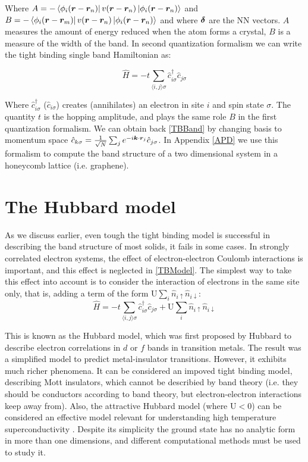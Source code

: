 Where $A = -\bra{\phi_i(\boldsymbol{r}-\boldsymbol{r}_n)}v(\boldsymbol{r}-\boldsymbol{r}_n) \ket{\phi_i(\boldsymbol{r}-\boldsymbol{r}_n)}$ and $B = -\bra{\phi_i(\boldsymbol{r}-\boldsymbol{r}_m)}v(\boldsymbol{r}-\boldsymbol{r}_n) \ket{\phi_i(\boldsymbol{r}-\boldsymbol{r}_n)}$ and where $\boldsymbol{\delta}$ are the NN vectors. $A$ measures the amount of energy reduced when the atom forms a crystal, $B$ is a measure of the width of the band. 
In second quantization formalism we can write the tight binding single band Hamiltonian as:

\begin{equation}
\label{TBModel}
\hat{H} = -t\sum_{\langle i,j \rangle \sigma} \hat{c}^{\dagger}_{i\sigma}\hat{c}_{j\sigma}
\end{equation}

Where $\hat{c}^{\dagger}_{i\sigma}$ ($\hat{c}_{i\sigma}$) creates (annihilates) an electron in site $i$ and spin state $\sigma$. The quantity $t$ is the hopping amplitude, and plays the same role $B$ in the first quantization formalism. We can obtain back \ref{TBBand} by changing basis to momentum space $\hat{c}_{k\sigma} = \frac{1}{\sqrt{N}}\sum_j e^{-i\boldsymbol{k}\cdot\boldsymbol{r}_j}\hat{c}_{j\sigma}$. In Appendix \ref{APD} we use this formalism to compute the band structure of a two dimensional system in a honeycomb lattice (i.e. graphene).



\section{The Hubbard model}

As we discuss earlier, even tough the tight binding model is successful in describing the band structure of most solids, it fails in some cases. In strongly correlated electron systems, the effect of electron-electron Coulomb interactions is important, and this effect is neglected in \ref{TBModel}. The simplest way to take this effect into account is to consider the interaction of electrons in the same site only, that is, adding a term of the form $\text{U}\sum_i \hat{n}_{i\uparrow}\hat{n}_{i\downarrow}$:
\begin{equation}
\label{HH}
\hat{H} = -t\sum_{\langle i,j \rangle \sigma} \hat{c}^{\dagger}_{i\sigma}\hat{c}_{j\sigma} + \text{U}\sum_i \hat{n}_{i\uparrow}\hat{n}_{i\downarrow}
\end{equation}

This is known as the Hubbard model, which was first proposed by Hubbard \cite{Hubbard1963} to describe electron correlations in $d$ or $f$ bands in transition metals. The result was a simplified model to predict metal-insulator transitions. However, it exhibits much richer phenomena. It can be considered an impoved tight binding model, describing Mott insulators, which cannot be describied by band theory (i.e. they should be conductors according to band theory, but electron-electron interactions keep away from). Also, the attractive Hubbard model (where $\text{U} < 0$) can be considered an effective model relevant for understanding high temperature superconductivity \cite{Alexandrov1981}. Despite its simplicity the ground state has no analytic form in more than one dimensions, and different computational methods must be used to study it.

